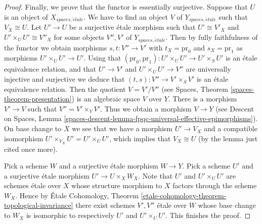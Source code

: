 \documentclass[10pt,a4paper]{amsart}
\theoremstyle{plain}
\theoremstyle{definition}
\theoremstyle{remark}
\numberwithin{equation}{subsection}
\def\etale{{\acute{e}tale}}
\begin{document}
\begin{proof}
\medskip\noindent
Finally, we prove that the functor is essentially surjective.
Suppose that $U$ is an object of $X_{spaces, \etale}$.
We have to find an object $V$ of $Y_{spaces, \etale}$
such that $V_X \cong U$. Let $U' \to U$ be a surjective \'etale morphism
such that $U' \cong V'_X$ and $U' \times_U U' \cong V''_X$
for some objects $V'', V'$ of $Y_{spaces, \etale}$.
Then by fully faithfulness of the functor we obtain morphisms
$s, t : V'' \to V'$ with $t_X = \text{pr}_0$ and $s_X = \text{pr}_1$
as morphisms $U' \times_U U' \to U'$. Using that
$(\text{pr}_0, \text{pr}_1) : U' \times_U U' \to U' \times_S U'$
is an \'etale equivalence relation, and that $U' \to V'$ and
$U' \times_U U' \to V''$ are universally injective and surjective
we deduce that
$(t, s) : V'' \to V' \times_S V'$ is an \'etale equivalence relation.
Then the quotient $V = V'/V''$ (see
Spaces, Theorem \ref{spaces-theorem-presentation})
is an algebraic space $V$ over $Y$. There is a morphism
$V' \to V$ such that $V'' = V' \times_V V'$. Thus we obtain a morphism
$V \to Y$ (see
Descent on Spaces, Lemma
\ref{spaces-descent-lemma-fpqc-universal-effective-epimorphisms}).
On base change to $X$ we see that we have a morphism $U' \to V_X$
and a compatible isomorphism $U' \times_{V_X} U' = U' \times_U U'$, which
implies that $V_X \cong U$ (by the lemma just cited once more).

\medskip\noindent
Pick a scheme $W$ and a surjective \'etale morphism $W \to Y$.
Pick a scheme $U'$ and a surjective \'etale morphism $U' \to U \times_X W_X$.
Note that $U'$ and $U' \times_U U'$ are schemes \'etale over $X$ whose
structure morphism to $X$ factors through the scheme $W_X$.
Hence by
\'Etale Cohomology,
Theorem \ref{etale-cohomology-theorem-topological-invariance}
there exist schemes $V', V''$ \'etale over $W$ whose base change to
$W_X$ is isomorphic to respectively $U'$ and $U' \times_U U'$.
This finishes the proof.
\end{proof}
\end{document}
